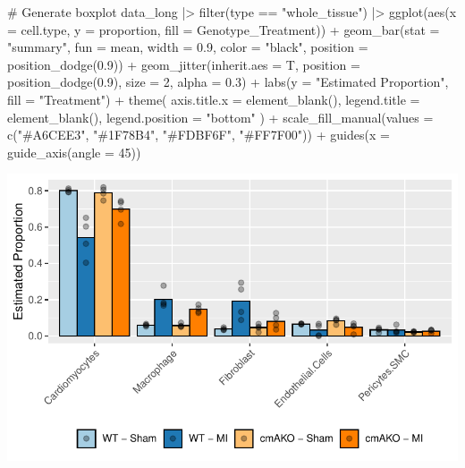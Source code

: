 \documentclass[
  letterpaper,
  DIV=11,
  numbers=noendperiod]{scrreprt}
\newenvironment{Shaded}{\begin{snugshade}}{\end{snugshade}}
\newcommand{\AttributeTok}[1]{\textcolor[rgb]{0.40,0.45,0.13}{#1}}
\newcommand{\CommentTok}[1]{\textcolor[rgb]{0.37,0.37,0.37}{#1}}
\newcommand{\DecValTok}[1]{\textcolor[rgb]{0.68,0.00,0.00}{#1}}
\newcommand{\FloatTok}[1]{\textcolor[rgb]{0.68,0.00,0.00}{#1}}
\newcommand{\FunctionTok}[1]{\textcolor[rgb]{0.28,0.35,0.67}{#1}}
\newcommand{\NormalTok}[1]{\textcolor[rgb]{0.00,0.23,0.31}{#1}}
\newcommand{\SpecialCharTok}[1]{\textcolor[rgb]{0.37,0.37,0.37}{#1}}
\newcommand{\StringTok}[1]{\textcolor[rgb]{0.13,0.47,0.30}{#1}}
\begin{document}
\begin{Shaded}
\begin{Highlighting}[]
\CommentTok{\# Generate boxplot}
\NormalTok{data\_long  }\SpecialCharTok{|\textgreater{}} 
  \FunctionTok{filter}\NormalTok{(type }\SpecialCharTok{==} \StringTok{"whole\_tissue"}\NormalTok{) }\SpecialCharTok{|\textgreater{}} 
  \FunctionTok{ggplot}\NormalTok{(}\FunctionTok{aes}\NormalTok{(}\AttributeTok{x =}\NormalTok{ cell.type, }\AttributeTok{y =}\NormalTok{ proportion, }\AttributeTok{fill =}\NormalTok{ Genotype\_Treatment)) }\SpecialCharTok{+}
  \FunctionTok{geom\_bar}\NormalTok{(}\AttributeTok{stat =} \StringTok{"summary"}\NormalTok{, }\AttributeTok{fun =}\NormalTok{ mean, }\AttributeTok{width =} \FloatTok{0.9}\NormalTok{,  }\AttributeTok{color =} \StringTok{"black"}\NormalTok{,}
           \AttributeTok{position =} \FunctionTok{position\_dodge}\NormalTok{(}\FloatTok{0.9}\NormalTok{)) }\SpecialCharTok{+}
  \FunctionTok{geom\_jitter}\NormalTok{(}\AttributeTok{inherit.aes =}\NormalTok{ T, }
              \AttributeTok{position =} \FunctionTok{position\_dodge}\NormalTok{(}\FloatTok{0.9}\NormalTok{),}
              \AttributeTok{size =} \DecValTok{2}\NormalTok{, }\AttributeTok{alpha =} \FloatTok{0.3}\NormalTok{) }\SpecialCharTok{+}
  \FunctionTok{labs}\NormalTok{(}\AttributeTok{y =} \StringTok{"Estimated Proportion"}\NormalTok{, }
       \AttributeTok{fill =} \StringTok{"Treatment"}\NormalTok{) }\SpecialCharTok{+}
  \FunctionTok{theme}\NormalTok{(}
    \AttributeTok{axis.title.x =} \FunctionTok{element\_blank}\NormalTok{(), }
    \AttributeTok{legend.title =} \FunctionTok{element\_blank}\NormalTok{(),}
    \AttributeTok{legend.position =} \StringTok{"bottom"}
\NormalTok{  ) }\SpecialCharTok{+}
  \FunctionTok{scale\_fill\_manual}\NormalTok{(}\AttributeTok{values =} \FunctionTok{c}\NormalTok{(}\StringTok{"\#A6CEE3"}\NormalTok{, }\StringTok{"\#1F78B4"}\NormalTok{, }\StringTok{"\#FDBF6F"}\NormalTok{, }\StringTok{"\#FF7F00"}\NormalTok{)) }\SpecialCharTok{+}
  \FunctionTok{guides}\NormalTok{(}\AttributeTok{x =} \FunctionTok{guide\_axis}\NormalTok{(}\AttributeTok{angle =} \DecValTok{45}\NormalTok{))}
\end{Highlighting}
\end{Shaded}

\includegraphics{scripts/03_dataWrangling/class6_files/figure-pdf/unnamed-chunk-16-1.pdf}
\end{document}
